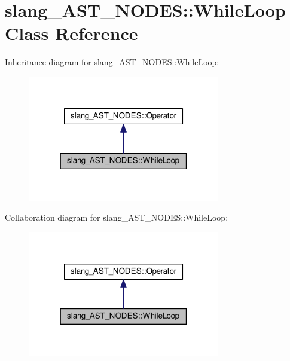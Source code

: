 \hypertarget{classslang__AST__NODES_1_1WhileLoop}{}\section{slang\+\_\+\+A\+S\+T\+\_\+\+N\+O\+D\+ES\+:\+:While\+Loop Class Reference}
\label{classslang__AST__NODES_1_1WhileLoop}


Inheritance diagram for slang\+\_\+\+A\+S\+T\+\_\+\+N\+O\+D\+ES\+:\+:While\+Loop\+:
\nopagebreak
\begin{figure}[H]
\begin{center}
\leavevmode
\includegraphics[width=238pt]{classslang__AST__NODES_1_1WhileLoop__inherit__graph}
\end{center}
\end{figure}


Collaboration diagram for slang\+\_\+\+A\+S\+T\+\_\+\+N\+O\+D\+ES\+:\+:While\+Loop\+:
\nopagebreak
\begin{figure}[H]
\begin{center}
\leavevmode
\includegraphics[width=238pt]{classslang__AST__NODES_1_1WhileLoop__coll__graph}
\end{center}
\end{figure}

